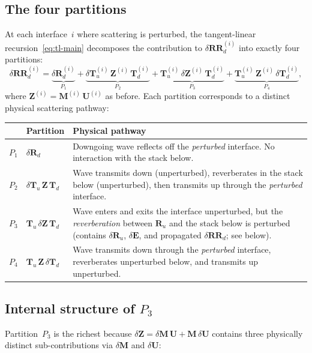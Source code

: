 \documentclass[11pt,a4paper]{article}
\newcommand{\dR}{\delta\mathbf{R}}
\newcommand{\dT}{\delta\mathbf{T}}
\newcommand{\dE}{\delta\mathbf{E}}
\newcommand{\dM}{\delta\mathbf{M}}
\newcommand{\dU}{\delta\mathbf{U}}
\newcommand{\dZ}{\delta\mathbf{Z}}
\newcommand{\dRR}{\delta\mathbf{RR}}
\newcommand{\Ru}{\mathbf{R}_u}
\newcommand{\Tu}{\mathbf{T}_u}
\newcommand{\Td}{\mathbf{T}_d}
\newcommand{\vM}{\mathbf{M}}
\newcommand{\vU}{\mathbf{U}}
\newcommand{\vZ}{\mathbf{Z}}
\theoremstyle{plain}
\theoremstyle{remark}
\begin{document}
\subsection{The four partitions}\label{sec:four-partitions}

At each interface~$i$ where scattering is perturbed, the tangent-linear
recursion~\eqref{eq:tl-main} decomposes the contribution to
$\dRR_d^{(i)}$ into exactly four partitions:
\begin{equation}\label{eq:4part}
  \dRR_d^{(i)}
  = \underbrace{\dR_d^{(i)}}_{P_1}
  + \underbrace{\dT_u^{(i)}\,\vZ^{(i)}\,\Td^{(i)}}_{P_2}
  + \underbrace{\Tu^{(i)}\,\dZ^{(i)}\,\Td^{(i)}}_{P_3}
  + \underbrace{\Tu^{(i)}\,\vZ^{(i)}\,\dT_d^{(i)}}_{P_4},
\end{equation}
where $\vZ^{(i)} = \vM^{(i)}\,\vU^{(i)}$ as before.  Each partition
corresponds to a distinct physical scattering pathway:

\begin{center}
\renewcommand{\arraystretch}{1.3}
\begin{tabular}{clp{7.5cm}}
  \toprule
  & \textbf{Partition} & \textbf{Physical pathway} \\
  \midrule
  $P_1$ & $\dR_d$
    & Downgoing wave reflects off the \emph{perturbed} interface.
      No interaction with the stack below. \\
  $P_2$ & $\dT_u\,\vZ\,\Td$
    & Wave transmits down (unperturbed), reverberates in the
      stack below (unperturbed), then transmits up through the
      \emph{perturbed} interface. \\
  $P_3$ & $\Tu\,\dZ\,\Td$
    & Wave enters and exits the interface unperturbed, but the
      \emph{reverberation} between $\Ru$ and the stack below is
      perturbed (contains $\dR_u$, $\dE$, and propagated
      $\dRR_d$; see below). \\
  $P_4$ & $\Tu\,\vZ\,\dT_d$
    & Wave transmits down through the \emph{perturbed} interface,
      reverberates unperturbed below, and transmits up
      unperturbed. \\
  \bottomrule
\end{tabular}
\end{center}

\subsection{Internal structure of $P_3$}\label{sec:P3}

Partition~$P_3$ is the richest because $\dZ = \dM\,\vU + \vM\,\dU$
contains three physically distinct sub-contributions via $\dM$ and
$\dU$:
\end{document}
